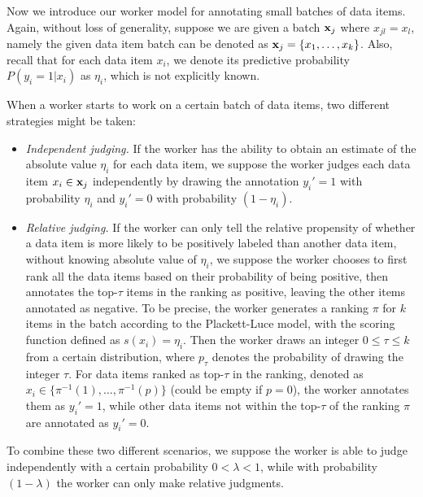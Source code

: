 %

Now we introduce our worker model for annotating small batches of data items.
Again, without loss of generality, suppose we are given a batch ${\mathbf{x}}_j$ where $x_{jl} = x_l$,
namely the given data item batch can be denoted as ${\mathbf{x}}_j=\{x_1, \ldots, x_k\}$.
Also, recall that for each data item $x_i$, we denote its predictive probability $P(y_i = 1 | x_i)$ as $\eta_i$,
which is not explicitly known.

When a worker starts to work on a certain batch of data items,
two different strategies might be taken:
\begin{itemize}
  \item \emph{Independent judging.}
  If the worker has the ability to obtain an estimate of the absolute value $\eta_i$ for each data item,
  we suppose the worker judges each data item $x_i \in {\mathbf{x}}_j$ independently
  by drawing the annotation $y_i'=1$ with probability $\eta_i$ and $y_i' = 0$ with probability $(1 - \eta_i)$.
  \item \emph{Relative judging.}
  If the worker can only tell the relative propensity of whether a data item is more likely to be positively labeled than another data item,
  without knowing absolute value of $\eta_i$,
  we suppose the worker chooses to first rank all the data items based on their probability of being positive,
  then annotates the top-$\tau$ items in the ranking as positive, leaving the other items annotated as negative.
  To be precise, the worker generates a ranking $\pi$ for $k$ items in the batch according to the Plackett-Luce model,
  with the scoring function defined as $s(x_i) = \eta_i$.
  Then the worker draws an integer $0 \leq \tau \leq k$ from a certain distribution,
  where $p_\tau$ denotes the probability of drawing the integer $\tau$.
  For data items ranked as top-$\tau$ in the ranking,
  denoted as $x_i \in \{\pi^{-1}(1), \ldots, \pi^{-1}(p)\}$ (could be empty if $p = 0$),
  the worker annotates them as $y_i'=1$,
  while other data items not within the top-$\tau$ of the ranking $\pi$ are annotated as $y_i' = 0$.
\end{itemize}
To combine these two different scenarios,
we suppose the worker is able to judge independently with a certain probability $0 < \lambda < 1$,
while with probability $(1-\lambda)$ the worker can only make relative judgments.


